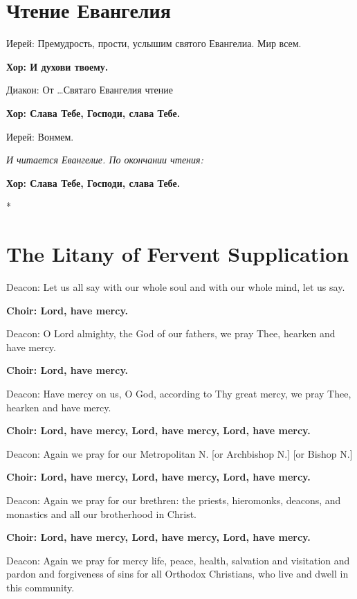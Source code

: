 \documentclass[12pt,a4paper,titlepage]{report}
\begin{document}
\begin{paracol}[1]{2}
  \switchcolumn[1]

  \section*{Чтение Евангелия}

  Иерей: Премудрость, прости, услышим святого Евангелиа. Мир всем.

  \textbf{Хор: И духови твоему.}

  Диакон: От \ldots Святаго Евангелия чтение

  \textbf{Хор: Слава Тебе, Господи, слава Тебе.}

  Иерей: Вонмем.

  \indent \textit{И читается Евангелие. По окончании чтения:}

  \textbf{Хор: Слава Тебе, Господи, слава Тебе.}

  \switchcolumn[0]*

  \section*{The Litany of Fervent Supplication}

  Deacon: Let us all say with our whole soul and with our whole mind, let us say.

  \textbf{Choir: Lord, have mercy.}

  Deacon: O Lord almighty, the God of our fathers, we pray Thee, hearken and have mercy.

  \textbf{Choir: Lord, have mercy.}

  Deacon: Have mercy on us, O God, according to Thy great mercy, we pray Thee, hearken and have mercy.

  \textbf{Choir: Lord, have mercy, Lord, have mercy, Lord, have mercy.}

  Deacon: Again we pray for our Metropolitan N. [or Archbishop N.] [or Bishop N.]

  \textbf{Choir: Lord, have mercy, Lord, have mercy, Lord, have mercy.}

  Deacon: Again we pray for our brethren: the priests, hieromonks, deacons, and monastics and all our brotherhood in Christ.

  \textbf{Choir: Lord, have mercy, Lord, have mercy, Lord, have mercy.}

  Deacon: Again we pray for mercy life, peace, health, salvation and visitation and pardon and forgiveness of sins for all Orthodox Christians, who live and dwell in this community.


\end{paracol}
\end{document}
